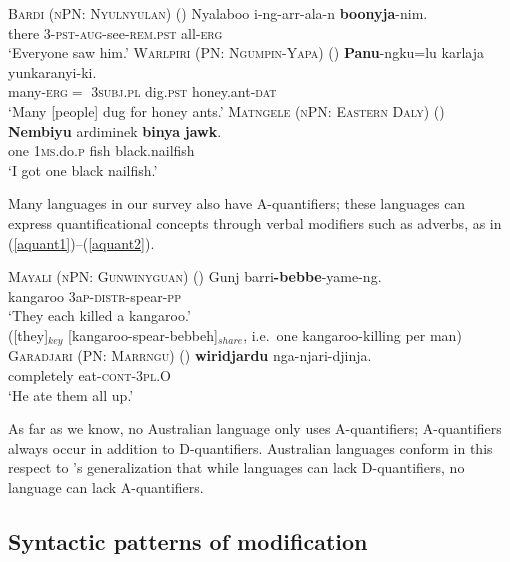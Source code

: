 \documentclass[12pt,egregdoesnotlikesansseriftitles]{scrartcl}
\begin{document}
\begin{exe}
  \ex\label{allerg} \textsc{Bardi (nPN: Nyulnyulan)} (\citealt[272]{bowern12})
  \gll Nyalaboo i-ng-arr-ala-n \textbf{boonyja}-nim.\\
  there 3-\textsc{pst}-\textsc{aug}-see-\textsc{rem.pst} all-\textsc{erg}\\
  \glt `Everyone saw him.'
  \ex \textsc{Warlpiri (PN: Ngumpin-Yapa)} (\citealt[6]{bowler17})
  \gll \textbf{Panu}-ngku=lu karlaja yunkaranyi-ki.\\
  many-\textsc{erg}$=$ \textsc{3subj.pl} dig.\textsc{pst} honey.ant-\textsc{dat}\\
  \glt `Many [people] dug for honey ants.' \label{agrmarking1}
  \ex \textsc{Matngele (nPN: Eastern Daly)} (\citealt[54]{zandvoort99})
  \gll \textbf{Nembiyu} ardiminek \textbf{binya} \textbf{jawk}.\\
  one 1\textsc{ms.}do.\textsc{p} fish black.nailfish\\
  \glt `I got one black nailfish.'  \label{discconst}
\end{exe}


Many languages in our survey also have A-quantifiers; these languages can express quantificational concepts through verbal modifiers such as adverbs, as in (\ref{aquant1})--(\ref{aquant2}).


\begin{exe}
  \ex \textsc{Mayali (nPN: Gunwinyguan)} (\citealt[221]{evans95})
  \gll Gunj barri\textbf{-bebbe}-yame-ng.\\
  kangaroo 3a\textsc{p-distr}-spear-\textsc{pp}\\
  \glt `They each killed a kangaroo.'\\
  ([they]$_{key}$ [kangaroo-spear-bebbeh]$_{share}$, i.e.\ one kangaroo-killing per man) \label{aquant1}
  \ex  \textsc{Garadjari (PN: Marrngu)} (\citealt[54]{sands89})
  \gll \textbf{wiridjardu}  nga-njari-djinja.\\
  completely  eat-\textsc{cont}-3\textsc{pl.O}\\
  \glt `He ate them all up.' \label{aquant2}
\end{exe}

As far as we know, no Australian language only uses A-quantifiers; A-quantifiers always  occur in addition to D-quantifiers. Australian languages conform in this respect to \cite{bachetal95}'s generalization that while languages can lack D-quantifiers, no language can lack A-quantifiers.

\subsection{Syntactic patterns of modification}
\end{document}

